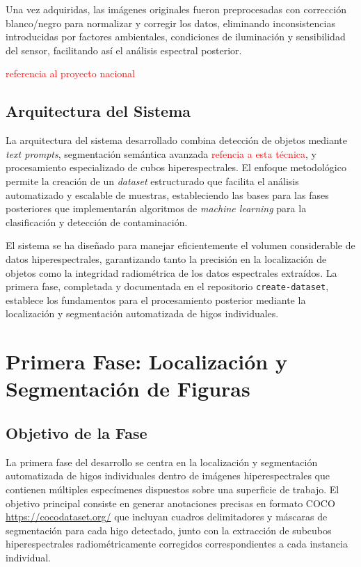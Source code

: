 Una vez adquiridas, las imágenes originales fueron preprocesadas con corrección blanco/negro para normalizar y corregir los datos, eliminando inconsistencias introducidas por factores ambientales, condiciones de iluminación y sensibilidad del sensor, facilitando así el análisis espectral posterior.

\textcolor{red}{referencia al proyecto nacional}


\subsection{Arquitectura del Sistema}

La arquitectura del sistema desarrollado combina detección de objetos mediante \emph{text prompts}, segmentación semántica avanzada \textcolor{red}{refencia a esta técnica}, y procesamiento especializado de cubos hiperespectrales. El enfoque metodológico permite la creación de un \emph{dataset} estructurado que facilita el análisis automatizado y escalable de muestras, estableciendo las bases para las fases posteriores que implementarán algoritmos de \emph{machine learning} para la clasificación y detección de contaminación.

El sistema se ha diseñado para manejar eficientemente el volumen considerable de datos hiperespectrales, garantizando tanto la precisión en la localización de objetos como la integridad radiométrica de los datos espectrales extraídos. La primera fase, completada y documentada en el repositorio \texttt{create-dataset}, establece los fundamentos para el procesamiento posterior mediante la localización y segmentación automatizada de higos individuales.

\section{Primera Fase: Localización y Segmentación de Figuras}

\subsection{Objetivo de la Fase}

La primera fase del desarrollo se centra en la localización y segmentación automatizada de higos individuales dentro de imágenes hiperespectrales que contienen múltiples especímenes dispuestos sobre una superficie de trabajo. El objetivo principal consiste en generar anotaciones precisas en formato COCO \textcolor{blue}{\url{https://cocodataset.org/}} que incluyan cuadros delimitadores y máscaras de segmentación para cada higo detectado, junto con la extracción de subcubos hiperespectrales radiométricamente corregidos correspondientes a cada instancia individual.

